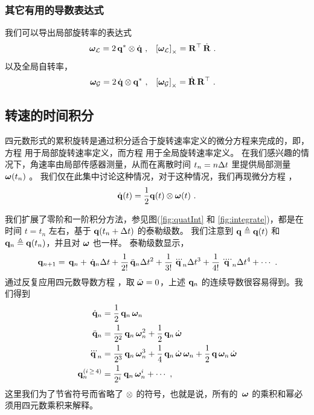 \subsubsection{其它有用的导数表达式}

我们可以导出局部旋转率的表达式
%
\begin{align}
{\bm \omega}_{\mathcal{L}} &= 2\,{\bf q}^*\otimes\dot{{\bf q}}~, 
&
\left[{\bm \omega}_{\mathcal{L}}\right]_\times &= {\bf R}^{\top}\,\dot{{\bf R}}~.
\end{align}%
%
以及全局自转率，
%
\begin{align}
{\bm \omega}_{\mathcal{G}} &= 2\,\dot{{\bf q}}\otimes{\bf q}^*~, 
&
\left[{\bm \omega}_{\mathcal{G}}\right]_\times &= \dot{{\bf R}}\,{\bf R}^{\top}~.
\end{align}%




\subsection{转速的时间积分}

四元数形式的累积旋转是通过积分适合于旋转速率定义的微分方程来完成的，即，方程  用于局部旋转速率定义，而方程  用于全局旋转速率定义。 
在我们感兴趣的情况下，角速率由局部传感器测量，从而在离散时间 $t_n=n\Delta t$ 里提供局部测量 ${\bm \omega}(t_n)$ 。
我们仅在此集中讨论这种情况，对于这种情况，我们再现微分方程 ，
%
\begin{align}
\dot{{\bf q}}(t) 
= \frac12{\bf q}(t)\otimes{\bm \omega}(t) 
~.
\label{equ:intLocal}
\end{align}

我们扩展了零阶和一阶积分方法，参见图(\ref{fig:quatInt} 和 \ref{fig:integrate})，都是在时间 $t=t_n$ 左右，基于 ${\bf q}(t_n+\Delta t)$ 的泰勒级数。 
我们注意到 ${\bf q}\triangleq{\bf q}(t)$ 和 ${\bf q}_n\triangleq{\bf q}(t_n)$，并且对 ${\bm \omega}$ 也一样。 
%
泰勒级数显示， 
%
\begin{align}
\,{\bf q}_{n+1} = \,{\bf q}_n + \,\dot{{\bf q}}_n\Delta t + \frac1{2!}\,\ddot{{\bf q}}_n\Delta t^2 + \frac1{3!}\,\dddot{{\bf q}}_n\Delta t^3 + \frac1{4!}\,\ddddot{\bf q}_n\Delta t^4 + \cdots~.
\label{equ:qnTaylor}
\end{align}
%
通过反复应用四元数导数方程 ，取 $\ddot{{\bm \omega}}=0$，上述 ${\bf q}_n$ 的连续导数很容易得到。我们得到
%
\begin{subequations}
%
\begin{align}
\,\dot{{\bf q}}_n 
&= \frac12\,{\bf q}_n\,{\bm \omega}_n \\
\,\ddot{{\bf q}}_n 
&= \frac1{2^2}\,{\bf q}_n\,{\bm \omega}_n^2+\frac12\,{\bf q}_n\,\dot{{\bm \omega}} \\
\,\dddot{{\bf q}}_n 
&= \frac1{2^3}\,{\bf q}_n\,{\bm \omega}_n^3 + \frac14\,{\bf q}_n\,\dot{{\bm \omega}}\,{\bm \omega}_n + \frac12\,{\bf q}\,{\bm \omega}_n\,\dot{{\bm \omega}} \\
\,{\bf q}_n^{(i\,\ge\,4)} 
&= \frac1{2^i}\,{\bf q}_n\,{\bm \omega}_n^i + \cdots~,
\end{align}%
\label{equ:qnDerivatives}%
\end{subequations}%
%
这里我们为了节省符号而省略了 $\otimes$ 的符号，也就是说，所有的 $\,{\bm \omega}$ 的乘积和幂必须用四元数乘积来解释。

